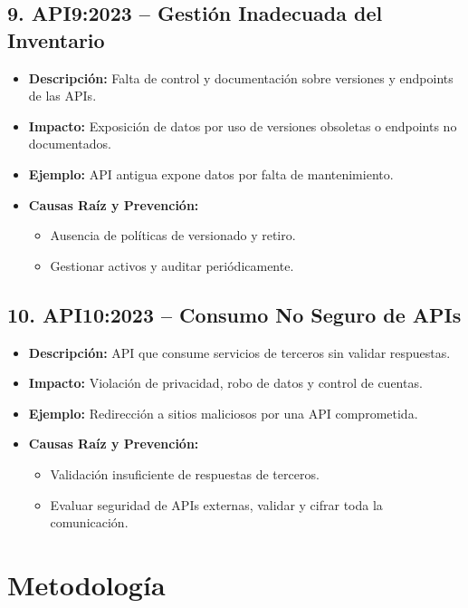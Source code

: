 \documentclass[a4paper,12pt]{article}
\begin{document}
\subsection{9. API9:2023 – Gestión Inadecuada del Inventario}
\begin{itemize}
    \item \textbf{Descripción:} Falta de control y documentación sobre versiones y endpoints de las APIs.
    \item \textbf{Impacto:} Exposición de datos por uso de versiones obsoletas o endpoints no documentados.
    \item \textbf{Ejemplo:} API antigua expone datos por falta de mantenimiento.
    \item \textbf{Causas Raíz y Prevención:}
    \begin{itemize}
        \item Ausencia de políticas de versionado y retiro.
        \item Gestionar activos y auditar periódicamente.
    \end{itemize}
\end{itemize}

\subsection{10. API10:2023 – Consumo No Seguro de APIs}
\begin{itemize}
    \item \textbf{Descripción:} API que consume servicios de terceros sin validar respuestas.
    \item \textbf{Impacto:} Violación de privacidad, robo de datos y control de cuentas.
    \item \textbf{Ejemplo:} Redirección a sitios maliciosos por una API comprometida.
    \item \textbf{Causas Raíz y Prevención:}
    \begin{itemize}
        \item Validación insuficiente de respuestas de terceros.
        \item Evaluar seguridad de APIs externas, validar y cifrar toda la comunicación.
    \end{itemize}
\end{itemize}



\section{Metodolog\'ia}
\end{document}
